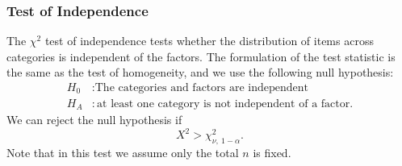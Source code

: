 \documentclass{article}
\begin{document}
\subsubsection{Test of Independence}
The \(\chi^2\) test of independence tests whether the distribution of items across categories is independent of the
factors. The formulation of the test statistic is the same as the test of homogeneity, and we use the following
null hypothesis:
\begin{align*}
    H_0 & : \text{The categories and factors are independent}            \\
    H_A & : \text{at least one category is not independent of a factor}.
\end{align*}
We can reject the null hypothesis if
\begin{equation*}
    X^2 > \chi_{\nu, \: 1 - \alpha}^2.
\end{equation*}
Note that in this test we assume only the total \(n\) is fixed.
\end{document}
